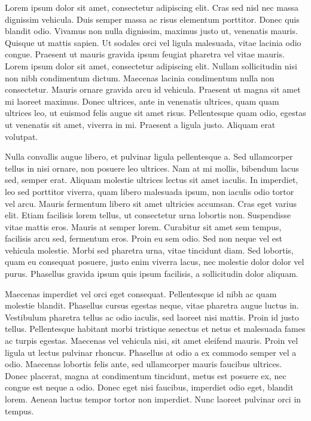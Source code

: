 \documentclass{article}
\begin{document}
 Lorem ipsum dolor sit amet, consectetur adipiscing elit. Cras sed nisl nec massa dignissim vehicula. Duis semper massa ac risus elementum porttitor. Donec quis blandit odio. Vivamus non nulla dignissim, maximus justo ut, venenatis mauris. Quisque ut mattis sapien. Ut sodales orci vel ligula malesuada, vitae lacinia odio congue. Praesent ut mauris gravida ipsum feugiat pharetra vel vitae mauris. Lorem ipsum dolor sit amet, consectetur adipiscing elit. Nullam sollicitudin nisi non nibh condimentum dictum. Maecenas lacinia condimentum nulla non consectetur. Mauris ornare gravida arcu id vehicula. Praesent ut magna sit amet mi laoreet maximus. Donec ultrices, ante in venenatis ultrices, quam quam ultrices leo, ut euismod felis augue sit amet risus. Pellentesque quam odio, egestas ut venenatis sit amet, viverra in mi. Praesent a ligula justo. Aliquam erat volutpat. 



 Nulla convallis augue libero, et pulvinar ligula pellentesque a. Sed ullamcorper tellus in nisi ornare, non posuere leo ultrices. Nam at mi mollis, bibendum lacus sed, semper erat. Aliquam molestie ultrices lectus sit amet iaculis. In imperdiet, leo sed porttitor viverra, quam libero malesuada ipsum, non iaculis odio tortor vel arcu. Mauris fermentum libero sit amet ultricies accumsan. Cras eget varius elit. Etiam facilisis lorem tellus, ut consectetur urna lobortis non. Suspendisse vitae mattis eros. Mauris at semper lorem. Curabitur sit amet sem tempus, facilisis arcu sed, fermentum eros. Proin eu sem odio. Sed non neque vel est vehicula molestie. Morbi sed pharetra urna, vitae tincidunt diam. Sed lobortis, quam eu consequat posuere, justo enim viverra lacus, nec molestie dolor dolor vel purus. Phasellus gravida ipsum quis ipsum facilisis, a sollicitudin dolor aliquam. 



 Maecenas imperdiet vel orci eget consequat. Pellentesque id nibh ac quam molestie blandit. Phasellus cursus egestas neque, vitae pharetra augue luctus in. Vestibulum pharetra tellus ac odio iaculis, sed laoreet nisi mattis. Proin id justo tellus. Pellentesque habitant morbi tristique senectus et netus et malesuada fames ac turpis egestas. Maecenas vel vehicula nisi, sit amet eleifend mauris. Proin vel ligula ut lectus pulvinar rhoncus. Phasellus at odio a ex commodo semper vel a odio. Maecenas lobortis felis ante, sed ullamcorper mauris faucibus ultrices. Donec placerat, magna at condimentum tincidunt, metus est posuere ex, nec congue est neque a odio. Donec eget nisi faucibus, imperdiet odio eget, blandit lorem. Aenean luctus tempor tortor non imperdiet. Nunc laoreet pulvinar orci in tempus. 
\end{document}
